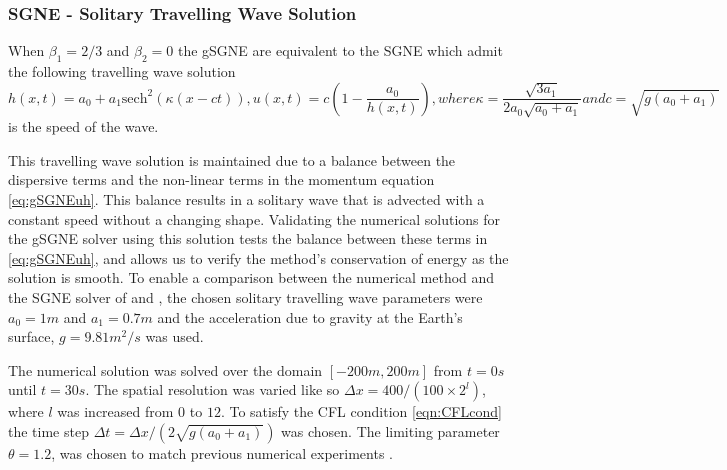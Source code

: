 \documentclass[10pt]{elsarticle}
\begin{document}
\subsubsection{SGNE - Solitary Travelling Wave Solution}
When $\beta_1 = 2/3$ and $\beta_2 = 0$ the gSGNE are equivalent to the SGNE which admit the following travelling wave solution \cite{El-etal-2006}
\begin{subequations}
	\begin{equation}
	h(x,t) = a_0 + a_1 \text{sech}^2\left( \kappa (x - ct) \right),
	\end{equation}
	\begin{equation}
	u(x,t) = c \left( 1- \dfrac{a_0}{h(x,t)} \right),
	\end{equation}
	where
	\begin{equation}
	\kappa = \dfrac{\sqrt{3a_1}}{2a_0 \sqrt{a_0 + a_1}}
	\end{equation}
	and
	\begin{equation}
	c = \sqrt{g\left(a_0 + a_1\right)}
	\label{eq:Sol_speed}
	\end{equation}
\end{subequations}
is the speed of the wave.

This travelling wave solution is maintained due to a balance between the dispersive terms and the non-linear terms in the momentum equation \eqref{eq:gSGNEuh}. This balance results in a solitary wave that is advected with a constant speed without a changing shape. Validating the numerical solutions for the gSGNE solver using this solution tests the balance between these terms in \eqref{eq:gSGNEuh}, and allows us to verify the method's conservation of energy as the solution is smooth. To enable a comparison between the numerical method and the SGNE solver of \citet{Zoppou-etal-2017} and \citet{Pitt-2019}, the chosen solitary travelling wave parameters were $a_0 = 1m$ and $a_1 = 0.7m$ and the acceleration due to gravity at the Earth's surface, $g = 9.81 m^2/s$ was used.


The numerical solution was solved over the domain $\left[-200m,200m\right]$ from $t=0s$ until $t=30s$. The spatial resolution was varied like so $\Delta x = 400 / (100 \times 2^{l})$, where $l$ was increased from $0$ to $12$. To satisfy the CFL condition \eqref{eqn:CFLcond} the time step $\Delta t = \Delta x  / ( 2 \sqrt{g(a_0 + a_1)})$ was chosen. The limiting parameter $\theta = 1.2$, was chosen to match previous numerical experiments \cite{Zoppou-etal-2017,Pitt-2019}.
\end{document}
